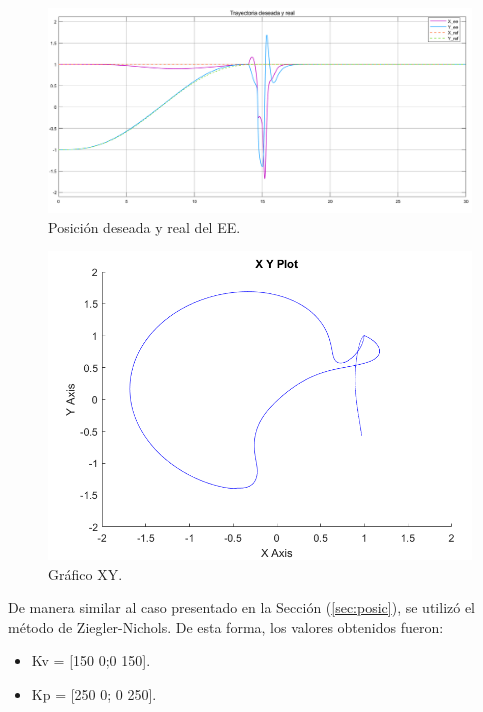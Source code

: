 \begin{figure}[H]
	\centering
	\includegraphics[width=0.8\linewidth]{ImagenesControl de posición no lineal/1_3_e_b}
	\caption{Posición deseada y real del EE.}	
	\label{fig:aposd}
\end{figure}

\begin{figure}[H]
	\centering
	\includegraphics[width=0.5\linewidth]{ImagenesControl de posición no lineal/1_3_e_c}
	\caption{Gráfico XY.}	
	\label{fig:axyd}
\end{figure}

De manera similar al caso presentado en la Sección (\ref{sec:posic}), se utilizó el método de Ziegler-Nichols. De esta forma, los valores obtenidos fueron:
\begin{itemize}
	\item Kv = [150 0;0 150].
	\item Kp = [250 0; 0 250].
\end{itemize}

%